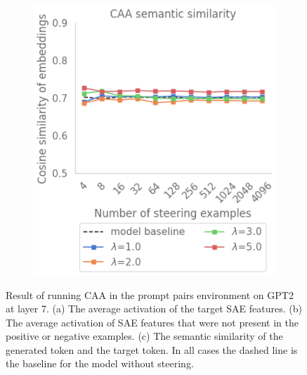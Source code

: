 \begin{figure}
\begin{subfigure}{0.43\textwidth}
        \caption{ }
    \end{subfigure}
    \begin{subfigure}{0.45\textwidth}
        \includegraphics[width=\textwidth]{figures/prompt_pairs_caa_3.png}
        \caption{ }
    \end{subfigure}
    \caption{Result of running CAA \cite{caa} in the prompt pairs environment  on GPT2 at layer 7. (a) The average activation of the target SAE features. (b) The average activation of SAE features that were not present in the positive or negative examples. (c) The semantic similarity of the generated token and the target token. In all cases the dashed line is the baseline for the model without steering.}
    \label{fig:gpt_pp_caa}
\end{figure}


